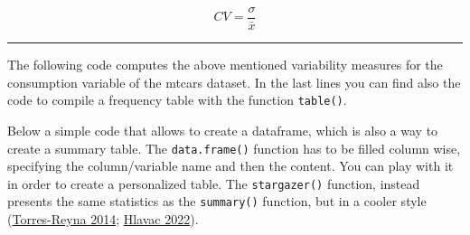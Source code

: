 \documentclass[
]{svmono}
\newenvironment{Shaded}{\begin{snugshade}}{\end{snugshade}}
\newcommand{\AttributeTok}[1]{\textcolor[rgb]{0.13,0.29,0.53}{#1}}
\newcommand{\CommentTok}[1]{\textcolor[rgb]{0.56,0.35,0.01}{\textit{#1}}}
\newcommand{\DecValTok}[1]{\textcolor[rgb]{0.00,0.00,0.81}{#1}}
\newcommand{\FunctionTok}[1]{\textcolor[rgb]{0.13,0.29,0.53}{\textbf{#1}}}
\newcommand{\NormalTok}[1]{#1}
\newcommand{\SpecialCharTok}[1]{\textcolor[rgb]{0.81,0.36,0.00}{\textbf{#1}}}
\begin{document}
\begin{equation}
CV=\frac{\sigma}{\bar{x}}
\label{eq:cv}
\end{equation}

\begin{center}\rule{0.5\linewidth}{0.5pt}\end{center}

The following code computes the above mentioned variability measures for
the consumption variable of the mtcars dataset. In the last lines you
can find also the code to compile a frequency table with the function
\texttt{table()}.

\begin{Shaded}
\end{Shaded}

Below a simple code that allows to create a dataframe, which is also a
way to create a summary table. The \texttt{data.frame()} function has to be
filled column wise, specifying the column/variable name and then the
content. You can play with it in order to create a personalized table.
The \texttt{stargazer()} function, instead presents the same statistics as the
\texttt{summary()} function, but in a cooler style (\protect\hyperlink{ref-torres-reyna2014}{Torres-Reyna 2014}; \protect\hyperlink{ref-hlavac2022}{Hlavac 2022}).
\end{document}
